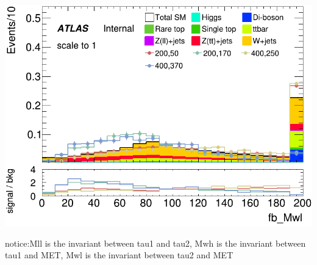 \documentclass[usenames,dvipsnames]{beamer}
\begin{document}
\begin{frame}
\begin{minipage}{0.32\textwidth}
        \centering
        \includegraphics[width=\textwidth]{graphics/LH_met_sig/LH_fb_Mwl_norm.png}
    \end{minipage}	
notice:Mll is the invariant between tau1 and tau2, Mwh is the invariant between tau1 and MET, Mwl is the invariant between tau2 and MET  
\end{frame}
\end{document}
